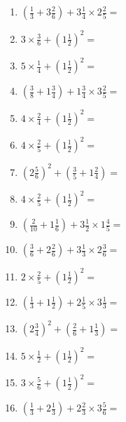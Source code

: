 \documentclass[12pt]{article}
\begin{document}
\begin{enumerate}
\item \large $ (\frac{1}{3} + 3 \frac{2}{6}) + 3 \frac{1}{4} \times 2 \frac{2}{5} = $ \vspace{1.8cm}
\item \large $ 3 \times \frac{3}{6} + (1 \frac{1}{2})^2 = $ \vspace{1.8cm}
\item \large $ 5 \times \frac{1}{4} + (1 \frac{1}{2})^2 = $ \vspace{1.8cm}
\item \large $ (\frac{3}{8} + 1 \frac{3}{4}) + 1 \frac{3}{4} \times 3 \frac{2}{5} = $ \vspace{1.8cm}
\newpage
\item \large $ 4 \times \frac{2}{4} + (1 \frac{1}{2})^2 = $ \vspace{1.8cm}
\item \large $ 4 \times \frac{2}{5} + (1 \frac{1}{2})^2 = $ \vspace{1.8cm}
\item \large $ (2 \frac{5}{6})^2 + (\frac{3}{5} + 1 \frac{2}{4}) = $ \vspace{1.8cm}
\item \large $ 4 \times \frac{2}{5} + (1 \frac{1}{2})^2 = $ \vspace{1.8cm}
\item \large $ (\frac{2}{10} + 1 \frac{1}{6}) + 3 \frac{1}{2} \times 1 \frac{4}{5} = $ \vspace{1.8cm}
\item \large $ (\frac{3}{6} + 2 \frac{2}{6}) + 3 \frac{1}{3} \times 2 \frac{3}{6} = $ \vspace{1.8cm}
\item \large $ 2 \times \frac{2}{5} + (1 \frac{1}{2})^2 = $ \vspace{1.8cm}
\item \large $ (\frac{1}{3} + 1 \frac{1}{2}) + 2 \frac{1}{5} \times 3 \frac{1}{3} = $ \vspace{1.8cm}
\item \large $ (2 \frac{3}{4})^2 + (\frac{2}{6} + 1 \frac{1}{3}) = $ \vspace{1.8cm}
\item \large $ 5 \times \frac{1}{2} + (1 \frac{1}{2})^2 = $ \vspace{1.8cm}
\newpage
\item \large $ 3 \times \frac{5}{6} + (1 \frac{1}{2})^2 = $ \vspace{1.8cm}
\item \large $ (\frac{1}{3} + 2 \frac{1}{3}) + 2 \frac{2}{3} \times 3 \frac{5}{6} = $ \vspace{1.8cm}

\end{enumerate}
\end{document}
